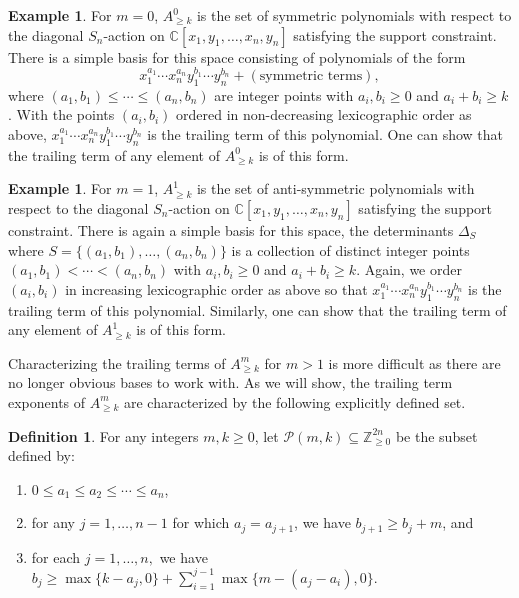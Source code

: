 \documentclass[12pt]{amsart}
\newcommand{\C}{\mathbb{C}}
\newcommand{\Z}{\mathbb{Z}}
\numberwithin{equation}{section}
\theoremstyle{definition}
\newtheorem{definition}[theorem]{Definition}
\newtheorem{example}[theorem]{Example}
\begin{document}
\begin{example}\label{ex:m=0}
    For $m=0$, $A^0_{\geq k}$ is the set of symmetric polynomials with respect to the diagonal $S_n$-action on $\C[x_1,y_1,\dots,x_n,y_n]$ satisfying the support constraint. There is a simple basis for this space consisting of polynomials of the form
    \[ x_1^{a_1}\cdots x_n^{a_n}y_1^{b_1}\cdots y_n^{b_n} + (\text{symmetric terms}),\]
    where $(a_1,b_1)\leq \cdots \leq (a_n,b_n)$ are integer points with $a_i,b_i\geq 0$ and $a_i+b_i\geq k$. With the points $(a_i,b_i)$ ordered in non-decreasing lexicographic order as above, $x_1^{a_1}\cdots x_n^{a_n}y_1^{b_1}\cdots y_n^{b_n}$ is the trailing term of this polynomial. One can show that the trailing term of any element of $A^0_{\geq k}$ is of this form.
\end{example}

\begin{example}\label{ex:m=1}
    For $m=1$, $A^1_{\geq k}$ is the set of anti-symmetric polynomials with respect to the diagonal $S_n$-action on $\C[x_1,y_1,\dots,x_n,y_n]$ satisfying the support constraint. There is again a simple basis for this space, the determinants $\Delta_S$ where $S = \{(a_1,b_1),\dots,(a_n,b_n)\}$ is a collection of distinct integer points $(a_1,b_1)<\cdots<(a_n,b_n)$ with $a_i,b_i\geq 0$ and $a_i+b_i\geq k$. Again, we order $(a_i,b_i)$ in increasing lexicographic order as above so that $x_1^{a_1}\cdots x_n^{a_n}y_1^{b_1}\cdots y_n^{b_n}$ is the trailing term of this polynomial. Similarly, one can show that the trailing term of any element of $A^1_{\geq k}$ is of this form.
\end{example}

Characterizing the trailing terms of $A^m_{\geq k}$ for $m>1$ is more difficult as there are no longer obvious bases to work with. As we will show, the trailing term exponents of $A^m_{\geq k}$ are characterized by the following explicitly defined set.

\begin{definition}\label{def:P(m,k)}
    For any integers $m,k\geq0$, let $\mathcal{P}(m,k)\subseteq\Z_{\ge 0}^{2n}$ be the subset defined by:
    \begin{enumerate}
        \item $0\leq a_1\leq a_2 \leq \cdots \leq a_n$,
        \item for any $j=1,\dots,n-1$ for which $a_j = a_{j+1}$, we have $b_{j+1}\geq b_j+m$, and
        \item for each $j=1,\dots,n,$ we have $b_j\geq \max\{k-a_j,0\} + \sum_{i=1}^{j-1}\max\{m-(a_j-a_i),0\}.$
    \end{enumerate}
\end{definition}
\end{document}

